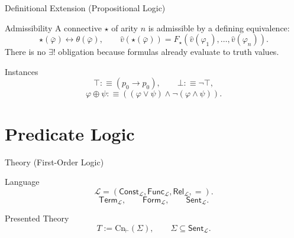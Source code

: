 \documentclass[12pt, a4paper]{report}
\begin{document}
\begin{modelbox}{Definitional Extension (Propositional Logic)}

\begin{modelcomponent}{Admissibility}
A connective \(\star\) of arity \(n\) is admissible by a defining equivalence:
\[
  \star(\bar\varphi)\leftrightarrow\theta(\bar\varphi),
  \qquad
  \widehat v(\star(\bar\varphi))
  =
  F_{\star}(\widehat v(\varphi_1),\ldots,\widehat v(\varphi_n)).
\]
There is no \(\exists!\) obligation because formulas already evaluate to truth
values.
\end{modelcomponent}

\begin{modelcomponent}{Instances}
\[
  \top:\equiv(p_0\to p_0),
  \qquad
  \bot:\equiv\neg\top,
\]
\[
  \varphi\oplus\psi
  :\equiv
  ((\varphi\vee\psi)\wedge\neg(\varphi\wedge\psi)).
\]
\end{modelcomponent}

\begin{modelconsequences}
\end{modelconsequences}
\end{modelbox}

\clearpage
\section*{Predicate Logic}

\begin{modelbox}{Theory (First-Order Logic)}

\begin{modelcomponent}{Language}
\[
  \mathcal L=(\mathsf{Const}_{\mathcal L},
  \mathsf{Func}_{\mathcal L},
  \mathsf{Rel}_{\mathcal L},=).
\]
\[
  \mathsf{Term}_{\mathcal L},
  \qquad
  \mathsf{Form}_{\mathcal L},
  \qquad
  \mathsf{Sent}_{\mathcal L}.
\]
\end{modelcomponent}

\begin{modelcomponent}{Presented Theory}
\[
  T:=\mathrm{Cn}_{\vdash}(\Sigma),
  \qquad
  \Sigma\subseteq\mathsf{Sent}_{\mathcal L}.
\]
\end{modelcomponent}

\begin{modelconsequences}
\end{modelconsequences}
\end{modelbox}
\end{document}
